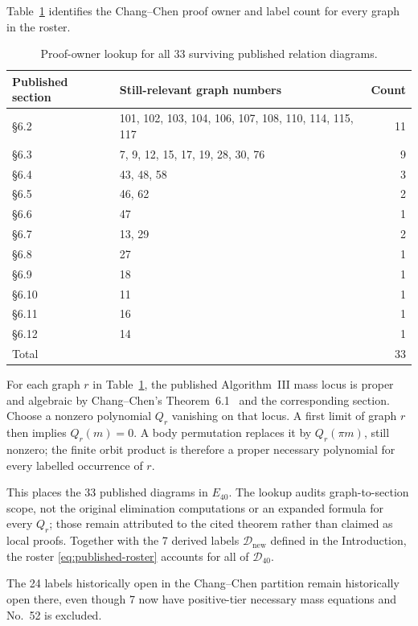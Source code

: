 \documentclass[11pt]{amsart}
\theoremstyle{remark}
\newcommand{\D}{\mathcal D}
\newcommand{\Needspace}[1]{\par\ifdim\dimexpr\pagegoal-\pagetotal\relax<#1\newpage\fi}
\begin{document}
Table~\ref{tab:CC-owner} identifies the Chang--Chen proof
owner and label count for every graph in the roster.
\begin{table}[ht]
\centering\small
\begin{tabular}{p{2.8cm}p{9.9cm}r}
\hline
Published section & Still-relevant graph numbers & Count \\
\hline
\S 6.2 & 101, 102, 103, 104, 106, 107, 108, 110, 114, 115, 117 & 11 \\
\S 6.3 & 7, 9, 12, 15, 17, 19, 28, 30, 76 & 9 \\
\S 6.4 & 43, 48, 58 & 3 \\
\S 6.5 & 46, 62 & 2 \\
\S 6.6 & 47 & 1 \\
\S 6.7 & 13, 29 & 2 \\
\S 6.8 & 27 & 1 \\
\S 6.9 & 18 & 1 \\
\S 6.10 & 11 & 1 \\
\S 6.11 & 16 & 1 \\
\S 6.12 & 14 & 1 \\
\hline
Total & & 33 \\
\hline
\end{tabular}
\caption{Proof-owner lookup for all 33 surviving published relation diagrams.}
\label{tab:CC-owner}
\end{table}

For each graph $r$ in Table~\ref{tab:CC-owner}, the
published Algorithm~III mass locus is proper and algebraic
by Chang--Chen's Theorem~6.1~\cite{CCII} and the corresponding
section. Choose a nonzero polynomial $Q_r$ vanishing on that
locus. A first limit of graph $r$ then implies $Q_r(m)=0$.
A body permutation replaces it by $Q_r(\pi m)$, still
nonzero; the finite orbit product is therefore a proper
necessary polynomial for every labelled occurrence of $r$.

This places the 33 published diagrams in $E_{40}$. The
lookup audits graph-to-section
scope, not the original elimination computations or an
expanded formula for every $Q_r$; those remain attributed
to the cited theorem rather than claimed as local proofs.
Together with the 7 derived labels $\D_{\mathrm{new}}$
defined in the Introduction, the roster \eqref{eq:published-roster}
accounts for all of $\D_{40}$.

\Needspace{5\baselineskip}
The 24 labels historically
open in the Chang--Chen partition remain historically open
there, even though 7 now have positive-tier necessary mass
equations and No.~52 is excluded.
\end{document}
